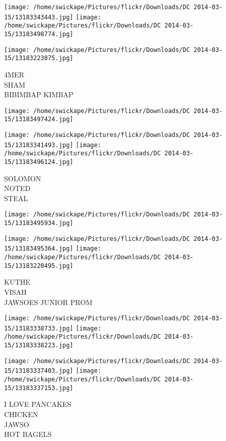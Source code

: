\documentclass[10pt,letterpaper]{article}
\begin{document}
\texttt{[image: /home/swickape/Pictures/flickr/Downloads/DC 2014-03-15/13183343443.jpg]}
\texttt{[image: /home/swickape/Pictures/flickr/Downloads/DC 2014-03-15/13183498774.jpg]}

\texttt{[image: /home/swickape/Pictures/flickr/Downloads/DC 2014-03-15/13183223875.jpg]}

4MER\\
SHAM\\
BIBIMBAP KIMBAP\\
\pagebreak

\texttt{[image: /home/swickape/Pictures/flickr/Downloads/DC 2014-03-15/13183497424.jpg]}

\vspace{0.25in}
\texttt{[image: /home/swickape/Pictures/flickr/Downloads/DC 2014-03-15/13183341493.jpg]}
\texttt{[image: /home/swickape/Pictures/flickr/Downloads/DC 2014-03-15/13183496124.jpg]}

SOLOMON\\
NOTED\\
STEAL\\
\pagebreak

\texttt{[image: /home/swickape/Pictures/flickr/Downloads/DC 2014-03-15/13183495934.jpg]}

\vspace{0.25in}
\texttt{[image: /home/swickape/Pictures/flickr/Downloads/DC 2014-03-15/13183495364.jpg]}
\texttt{[image: /home/swickape/Pictures/flickr/Downloads/DC 2014-03-15/13183220495.jpg]}

KUTHE\\
VISAH\\
JAWSOES JUNIOR PROM\\
\pagebreak

\texttt{[image: /home/swickape/Pictures/flickr/Downloads/DC 2014-03-15/13183338733.jpg]}
\texttt{[image: /home/swickape/Pictures/flickr/Downloads/DC 2014-03-15/13183338223.jpg]}

\texttt{[image: /home/swickape/Pictures/flickr/Downloads/DC 2014-03-15/13183337403.jpg]}
\texttt{[image: /home/swickape/Pictures/flickr/Downloads/DC 2014-03-15/13183337153.jpg]}

I LOVE PANCAKES\\
CHICKEN\\
JAWSO\\
HOT BAGELS\\
\pagebreak
\end{document}
